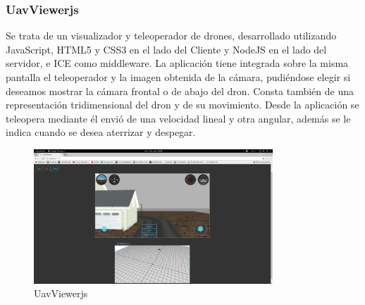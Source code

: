 \subsubsection{UavViewerjs}

Se trata de un visualizador y teleoperador de drones, desarrollado utilizando JavaScript, HTML5 y CSS3 en el lado del Cliente y NodeJS en el lado del servidor, e ICE como middleware. La aplicación tiene integrada sobre la misma pantalla el teleoperador y la imagen obtenida de la cámara, pudiéndose elegir si deseamos mostrar la cámara frontal o de abajo del dron. Consta también de una representación tridimensional del dron y de su movimiento. Desde la aplicación se teleopera mediante él envió de una velocidad lineal y otra angular, además se le indica cuando se desea aterrizar y despegar.

\begin{figure}[H]
  \begin{center}
    \includegraphics[width=0.8\textwidth]{figures/uavviewerjs.png}
		\caption{UavViewerjs}
		\label{fig.uavviewerjs}
		\end{center}
\end{figure}